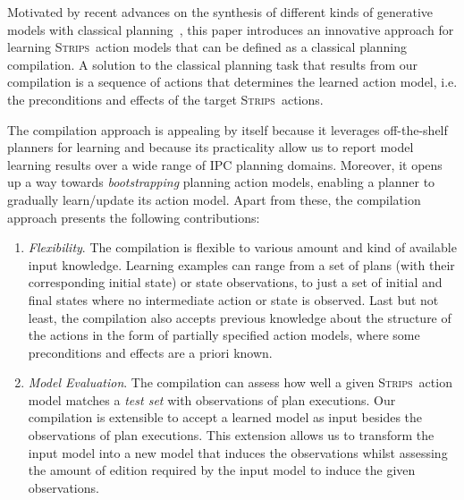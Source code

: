 \documentclass[3p,times]{elsarticle}
\newcommand{\strips}{\textsc{Strips}}     %
\begin{document}
Motivated by recent advances on the synthesis of different kinds of generative models with classical planning~\cite{bonet2009automatic,segovia2016generalized,segovia2016hierarchical,segovia2017generating}, this paper introduces an innovative approach for learning \strips\ action models that can be defined as a classical planning compilation. A solution to the classical planning task that results from our compilation is a sequence of actions that determines the learned action model, i.e. the preconditions and effects of the target \strips\ actions.

The compilation approach is appealing by itself because it leverages off-the-shelf planners for learning and because its practicality allow us to report model learning results over a wide range of IPC planning domains. Moreover, it opens up a way towards \emph{bootstrapping} planning action models, enabling a planner to gradually learn/update its action model. Apart from these, the compilation approach presents the following contributions:
\begin{enumerate}
\item {\em Flexibility}. The compilation is flexible to various amount and kind of available input knowledge. Learning examples can range from a set of plans (with their corresponding initial state) or state observations, to just a set of initial and final states where no intermediate action or state is observed. Last but not least, the compilation also accepts previous knowledge about the structure of the actions in the form of partially specified action models, where some preconditions and effects are a priori known. %

\item {\em Model Evaluation}. The compilation can assess how well a given \strips\ action model matches a {\em test set} with observations of plan executions. Our compilation is extensible to accept a learned model as input besides the observations of plan executions. This extension allows us to transform the input model into a new model that induces the observations whilst assessing the amount of edition required by the input model to induce the given observations. 
\end{enumerate}
\end{document}
